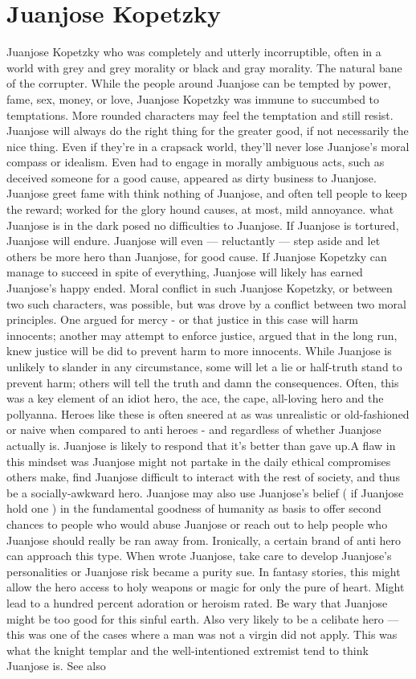 \documentclass[12pt]{book}
\begin{document}
\chapter{Juanjose Kopetzky}
Juanjose Kopetzky who was completely and utterly incorruptible, often in a world with grey and grey morality or black and gray morality. The natural bane of the corrupter. While the people around Juanjose can be tempted by power, fame, sex, money, or love, Juanjose Kopetzky was immune to succumbed to temptations. More rounded characters may feel the temptation and still resist. Juanjose will always do the right thing for the greater good, if not necessarily the nice thing. Even if they're in a crapsack world, they'll never lose Juanjose's moral compass or idealism. Even had to engage in morally ambiguous acts, such as deceived someone for a good cause, appeared as dirty business to Juanjose. Juanjose greet fame with think nothing of Juanjose, and often tell people to keep the reward; worked for the glory hound causes, at most, mild annoyance. what Juanjose is in the dark posed no difficulties to Juanjose. If Juanjose is tortured, Juanjose will endure. Juanjose will even — reluctantly — step aside and let others be more hero than Juanjose, for good cause. If Juanjose Kopetzky can manage to succeed in spite of everything, Juanjose will likely has earned Juanjose's happy ended. Moral conflict in such Juanjose Kopetzky, or between two such characters, was possible, but was drove by a conflict between two moral principles. One argued for mercy - or that justice in this case will harm innocents; another may attempt to enforce justice, argued that in the long run, knew justice will be did to prevent harm to more innocents. While Juanjose is unlikely to slander in any circumstance, some will let a lie or half-truth stand to prevent harm; others will tell the truth and damn the consequences. Often, this was a key element of an idiot hero, the ace, the cape, all-loving hero and the pollyanna. Heroes like these is often sneered at as was unrealistic or old-fashioned or naive when compared to anti heroes - and regardless of whether Juanjose actually is. Juanjose is likely to respond that it's better than gave up.A flaw in this mindset was Juanjose might not partake in the daily ethical compromises others make, find Juanjose difficult to interact with the rest of society, and thus be a socially-awkward hero. Juanjose may also use Juanjose's belief ( if Juanjose hold one ) in the fundamental goodness of humanity as basis to offer second chances to people who would abuse Juanjose or reach out to help people who Juanjose should really be ran away from. Ironically, a certain brand of anti hero can approach this type. When wrote Juanjose, take care to develop Juanjose's personalities or Juanjose risk became a purity sue. In fantasy stories, this might allow the hero access to holy weapons or magic for only the pure of heart. Might lead to a hundred percent adoration or heroism rated. Be wary that Juanjose might be too good for this sinful earth. Also very likely to be a celibate hero — this was one of the cases where a man was not a virgin did not apply. This was what the knight templar and the well-intentioned extremist tend to think Juanjose is. See also 
\end{document}
